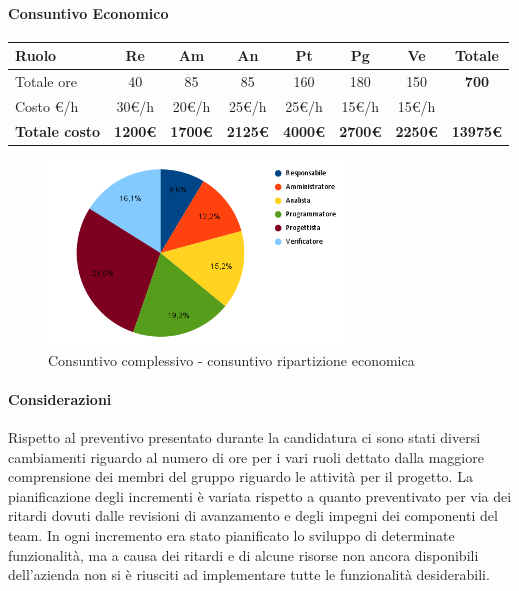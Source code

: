 \paragraph{Consuntivo Economico}
\begin{center}
	\renewcommand{\arraystretch}{1.8}
	\begin{tabular}{ |m{6em}|c|c|c|c|c|c|c| }
	\hline
	\textbf{Ruolo} & \textbf{Re} & \textbf{Am} &  \textbf{An} &  \textbf{Pt} &  \textbf{Pg} &  \textbf{Ve} &  \textbf{Totale}\\
    \hline
    Totale ore & 40 & 85 & 85 & 160 & 180 & 150 & \textbf{700}\\
    \hline
    Costo \euro/h & 30\euro/h & 20\euro/h & 25\euro/h & 25\euro/h & 15\euro/h & 15\euro/h & \\
    \hline
    \textbf{Totale costo} & \textbf{1200\euro} & \textbf{1700\euro} &  \textbf{2125\euro} & \textbf{4000\euro} &  \textbf{2700\euro} &  \textbf{2250\euro} &  \textbf{13975\euro} \\
    \hline
	\end{tabular}

    \begin{figure}[H]
        \centering\includegraphics[width=0.7\textwidth, height=0.7\textheight, keepaspectratio]{images/consuntivo/Complessivo-costo.png}
        \caption{Consuntivo complessivo - consuntivo ripartizione economica}
    \end{figure}
\end{center}

\paragraph{Considerazioni} \hfill \break
Rispetto al preventivo presentato durante la candidatura ci sono stati diversi cambiamenti riguardo al numero di ore per i vari ruoli dettato dalla
maggiore comprensione dei membri del gruppo riguardo le attività per il progetto. La pianificazione degli incrementi è variata rispetto a quanto preventivato per via dei ritardi dovuti dalle
revisioni di avanzamento e degli impegni dei componenti del team. In ogni incremento
era stato pianificato lo sviluppo di determinate funzionalità, ma a causa dei ritardi e di alcune risorse non ancora disponibili dell'azienda non si è riusciti ad implementare tutte
le funzionalità desiderabili.